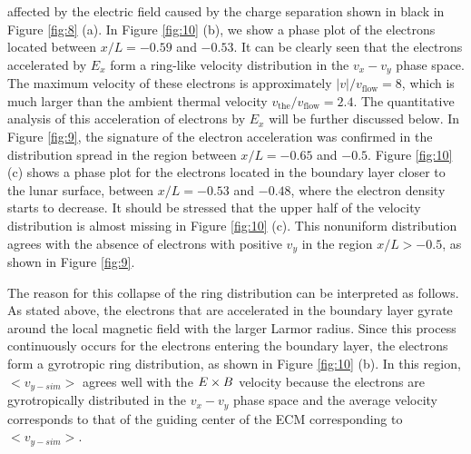 \documentclass[draft,jgrga]{agutex2015}
\begin{document}
\begin{article}
affected by the electric field caused by the charge separation
shown in black in Figure \ref{fig:8} (a).
In Figure \ref{fig:10} (b), we show a phase plot of the electrons located between 
$x/L = -0.59$ and $-0.53$.
It can be clearly seen that the electrons accelerated by $E_x$ form 
a ring-like velocity distribution in the $v_x-v_y$ phase space.
The maximum velocity of these electrons is approximately 
$|v|/v_\mathrm{flow} = 8$, which is much larger than 
the ambient thermal velocity $v_{\mathrm{the}}/v_\mathrm{flow} = 2.4$. 
The quantitative analysis of this acceleration of electrons by $E_x$ will be further
discussed below.
%
In Figure \ref{fig:9},
the signature of the electron acceleration
was confirmed in the distribution spread in the region between $x/L =-0.65$ and $-0.5$.
Figure \ref{fig:10} (c)
shows a phase plot for the electrons located in the boundary layer 
closer to the lunar surface, between $x/L = -0.53$ and $-0.48$, 
where the electron density starts to decrease.
It should be stressed that 
the upper half of the velocity distribution is almost missing in Figure \ref{fig:10} (c).
This nonuniform distribution agrees with the absence of
electrons with positive $v_y$ in
the region $x/L > -0.5$, as shown in Figure \ref{fig:9}.

The reason for this collapse of the ring distribution can be interpreted 
as follows.
As stated above, the electrons that are accelerated in the boundary layer
gyrate around the local magnetic field with the larger Larmor radius.
Since this process continuously occurs for the electrons 
entering the boundary layer,
the electrons form a gyrotropic ring distribution,
as shown in Figure \ref{fig:10} (b).
In this region, 
$<v_{y-sim}>$ agrees well with 
the $\mbox{\boldmath $E$} \times \mbox{\boldmath $B$}$ velocity
because the electrons are gyrotropically 
distributed in the $v_x-v_y$ phase space and the average velocity 
corresponds to that of the guiding center of the ECM corresponding to $<v_{y-sim}>$.


\end{article}
\end{document}
